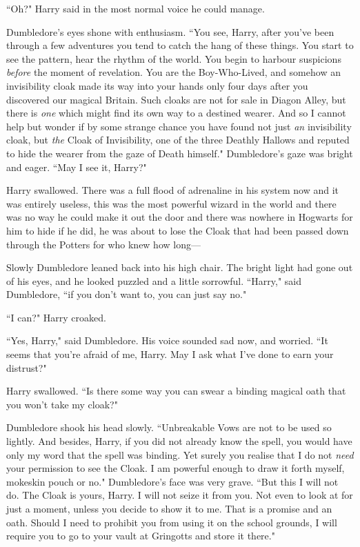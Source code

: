 ``Oh?" Harry said in the most normal voice he could manage.

Dumbledore's eyes shone with enthusiasm. ``You see, Harry, after you've been through a few adventures you tend to catch the hang of these things. You start to see the pattern, hear the rhythm of the world. You begin to harbour suspicions \emph{before} the moment of revelation. You are the Boy-Who-Lived, and somehow an invisibility cloak made its way into your hands only four days after you discovered our magical Britain. Such cloaks are not for sale in Diagon Alley, but there is \emph{one} which might find its own way to a destined wearer. And so I cannot help but wonder if by some strange chance you have found not just \emph{an} invisibility cloak, but \emph{the} Cloak of Invisibility, one of the three Deathly Hallows and reputed to hide the wearer from the gaze of Death himself." Dumbledore's gaze was bright and eager. ``May I see it, Harry?"

Harry swallowed. There was a full flood of adrenaline in his system now and it was entirely useless, this was the most powerful wizard in the world and there was no way he could make it out the door and there was nowhere in Hogwarts for him to hide if he did, he was about to lose the Cloak that had been passed down through the Potters for who knew how long—

Slowly Dumbledore leaned back into his high chair. The bright light had gone out of his eyes, and he looked puzzled and a little sorrowful. ``Harry," said Dumbledore, ``if you don't want to, you can just say no."

``I can?" Harry croaked.

``Yes, Harry," said Dumbledore. His voice sounded sad now, and worried. ``It seems that you're afraid of me, Harry. May I ask what I've done to earn your distrust?"

Harry swallowed. ``Is there some way you can swear a binding magical oath that you won't take my cloak?"

Dumbledore shook his head slowly. ``Unbreakable Vows are not to be used so lightly. And besides, Harry, if you did not already know the spell, you would have only my word that the spell was binding. Yet surely you realise that I do not \emph{need} your permission to see the Cloak. I am powerful enough to draw it forth myself, mokeskin pouch or no." Dumbledore's face was very grave. ``But this I will not do. The Cloak is yours, Harry. I will not seize it from you. Not even to look at for just a moment, unless you decide to show it to me. That is a promise and an oath. Should I need to prohibit you from using it on the school grounds, I will require you to go to your vault at Gringotts and store it there."

